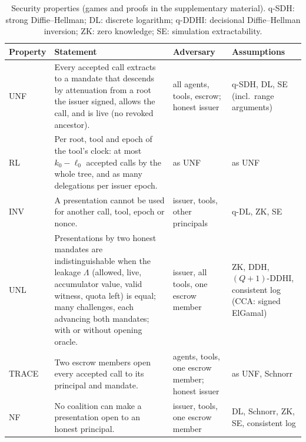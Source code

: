 \begin{table}[t]\centering\caption{Security properties (games and proofs in the supplementary material). q-SDH: strong Diffie--Hellman; DL: discrete logarithm; q-DDHI: decisional Diffie--Hellman inversion; ZK: zero knowledge; SE: simulation extractability.}\label{tab:props}
\scriptsize
\begin{tabular}{@{}p{}p{}p{}p{}@{}}\toprule
Property & Statement & Adversary & Assumptions\\\midrule
UNF & Every accepted call extracts to a mandate that descends by attenuation from a root the issuer signed, allows the call, and is live (no revoked ancestor). & all agents, tools, escrow; honest issuer & q-SDH, DL, SE (incl.\ range arguments)\\
RL & Per root, tool and epoch of the tool's clock: at most $k_0-\ell_0$ accepted calls by the whole tree, and as many delegations per issuer epoch. & as UNF & as UNF\\
INV & A presentation cannot be used for another call, tool, epoch or nonce. & issuer, tools, other principals & q-DL, ZK, SE\\
UNL & Presentations by two honest mandates are indistinguishable when the leakage $\Lambda$ (allowed, live, accumulator value, valid witness, quota left) is equal; many challenges, each advancing both mandates; with or without opening oracle. & issuer, all tools, one escrow member & ZK, DDH, $(Q{+}1)$-DDHI, consistent log (CCA: signed ElGamal)\\
TRACE & Two escrow members open every accepted call to its principal and mandate. & agents, tools, one escrow member; honest issuer & as UNF, Schnorr\\
NF & No coalition can make a presentation open to an honest principal. & issuer, tools, one escrow member & DL, Schnorr, ZK, SE, consistent log\\\bottomrule
\end{tabular}
\end{table}


